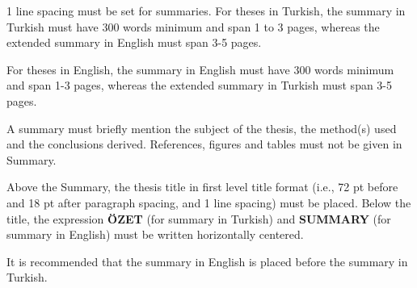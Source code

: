 1 line spacing must be set for summaries. For theses in Turkish, the summary in Turkish must have 300 words minimum and span 1 to 3 pages, whereas the extended summary in English must span 3-5 pages.

For theses in English, the summary in English must have 300 words minimum and span 1-3 pages, whereas the extended summary in Turkish must span 3-5 pages.

A summary must briefly mention the subject of the thesis, the method(s) used and the conclusions derived.
References, figures and tables must not be given in Summary.

Above the Summary, the thesis title in first level title format (i.e., 72 pt before and 18 pt after paragraph spacing, and 1 line spacing) must be placed. Below the title, the expression {\bf ÖZET} (for summary in Turkish) and {\bf SUMMARY} (for summary in English) must be written horizontally centered.

It is recommended that the summary in English is placed before the summary in Turkish.